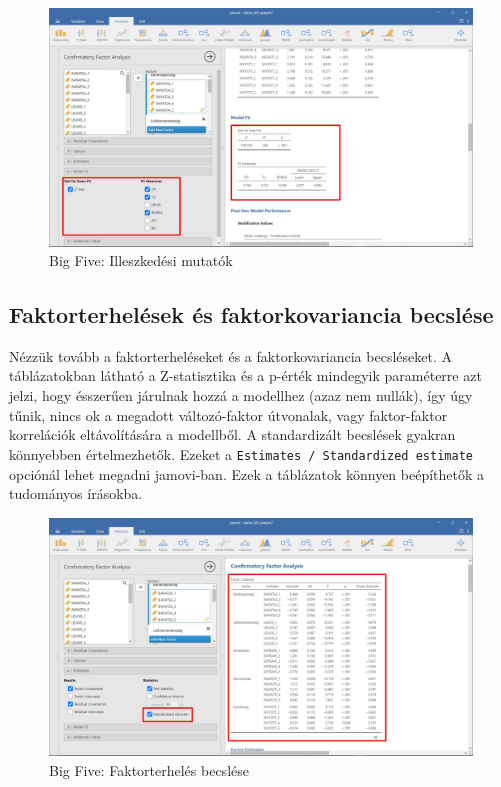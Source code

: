 \documentclass[
  letterpaper,
]{krantz}
\begin{document}
\begin{figure}

{\centering \includegraphics{./images/cfa_kep_02.jpg}

}

\caption{Big Five: Illeszkedési mutatók}

\end{figure}

\hypertarget{faktorterheluxe9sek-uxe9s-faktorkovariancia-becsluxe9se}{%
\subsection{Faktorterhelések és faktorkovariancia
becslése}\label{faktorterheluxe9sek-uxe9s-faktorkovariancia-becsluxe9se}}

Nézzük tovább a faktorterheléseket és a faktorkovariancia becsléseket. A
táblázatokban látható a Z-statisztika és a p-érték mindegyik paraméterre
azt jelzi, hogy ésszerűen járulnak hozzá a modellhez (azaz nem nullák),
így úgy tűnik, nincs ok a megadott változó-faktor útvonalak, vagy
faktor-faktor korrelációk eltávolítására a modellből. A standardizált
becslések gyakran könnyebben értelmezhetők. Ezeket a
\texttt{Estimates\ /\ Standardized\ estimate} opciónál lehet megadni
jamovi-ban. Ezek a táblázatok könnyen beépíthetők a tudományos írásokba.

\begin{figure}

{\centering \includegraphics{./images/cfa_kep_03.jpg}

}

\caption{Big Five: Faktorterhelés becslése}

\end{figure}
\end{document}
